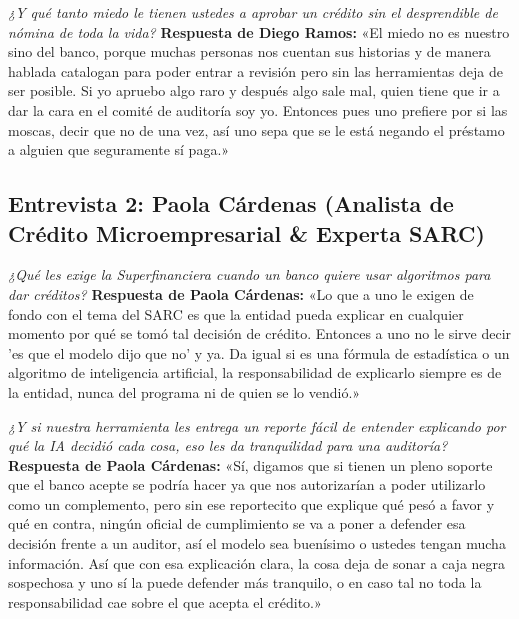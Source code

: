 \documentclass[11pt,a4paper]{article}
\begin{document}
\begin{tcolorbox}[colback=lightgray,colframe=primary,title=\textbf{Pregunta 4: Miedo a la aprobación sin desprendible de nómina}]
\textit{¿Y qué tanto miedo le tienen ustedes a aprobar un crédito sin el desprendible de nómina de toda la vida?}
\tcblower
\textbf{Respuesta de Diego Ramos:}  
«El miedo no es nuestro sino del banco, porque muchas personas nos cuentan sus historias y de manera hablada catalogan para poder entrar a revisión pero sin las herramientas deja de ser posible. Si yo apruebo algo raro y después algo sale mal, quien tiene que ir a dar la cara en el comité de auditoría soy yo. Entonces pues uno prefiere por si las moscas, decir que no de una vez, así uno sepa que se le está negando el préstamo a alguien que seguramente sí paga.»
\end{tcolorbox}

\subsection{Entrevista 2: Paola Cárdenas (Analista de Crédito Microempresarial \& Experta SARC)}

\begin{tcolorbox}[colback=lightgray,colframe=secondary,title=\textbf{Pregunta 5: Requerimientos de la Superintendencia Financiera (SARC)}]
\textit{¿Qué les exige la Superfinanciera cuando un banco quiere usar algoritmos para dar créditos?}
\tcblower
\textbf{Respuesta de Paola Cárdenas:}  
«Lo que a uno le exigen de fondo con el tema del SARC es que la entidad pueda explicar en cualquier momento por qué se tomó tal decisión de crédito. Entonces a uno no le sirve decir 'es que el modelo dijo que no' y ya. Da igual si es una fórmula de estadística o un algoritmo de inteligencia artificial, la responsabilidad de explicarlo siempre es de la entidad, nunca del programa ni de quien se lo vendió.»
\end{tcolorbox}

\begin{tcolorbox}[colback=lightgray,colframe=secondary,title=\textbf{Pregunta 6: Tranquilidad regulatoria con reportes de explicabilidad (XAI/SHAP)}]
\textit{¿Y si nuestra herramienta les entrega un reporte fácil de entender explicando por qué la IA decidió cada cosa, eso les da tranquilidad para una auditoría?}
\tcblower
\textbf{Respuesta de Paola Cárdenas:}  
«Sí, digamos que si tienen un pleno soporte que el banco acepte se podría hacer ya que nos autorizarían a poder utilizarlo como un complemento, pero sin ese reportecito que explique qué pesó a favor y qué en contra, ningún oficial de cumplimiento se va a poner a defender esa decisión frente a un auditor, así el modelo sea buenísimo o ustedes tengan mucha información. Así que con esa explicación clara, la cosa deja de sonar a caja negra sospechosa y uno sí la puede defender más tranquilo, o en caso tal no toda la responsabilidad cae sobre el que acepta el crédito.»
\end{tcolorbox}
\end{document}
